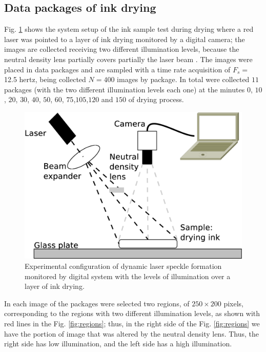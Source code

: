 \documentclass[review]{elsarticle}
\begin{document}
\subsection{Data packages of ink drying}
\label{sec:descriptionink}
Fig. \ref{fig:system} shows the system setup of the ink sample test during drying where
a red laser was pointed to a layer of ink drying monitored by a digital camera;
the images are collected receiving two different illumination levels, 
because the neutral density lens partially covers partially the laser beam \cite{REIS2016}.
The images were placed in data packages and
are sampled with a time rate acquisition of $F_s=$ 12.5 hertz, being 
collected $N=400$ images by package. In total were collected $11$ packages 
(with the two different illumination levels each one) at the minutes 
$0$, $10$, $20$, $30$, $40$, $50$, $60$, $75$,$105$,$120$ and $150$ of drying process. 
\begin{figure}[ht!]
\centering
\includegraphics[width=0.65\columnwidth]{system.eps}
\caption{Experimental configuration of dynamic laser speckle formation monitored by digital system with the levels of illumination over a layer of ink drying.}
\label{fig:system}
\end{figure}
In each image of the packages were selected two regions, of $250\times200$ pixels, 
corresponding to the regions with two different illumination levels, 
as shown with red lines in the Fig. \ref{fig:regions}; thus, 
in the right side of the Fig. \ref{fig:regions}  we have the
portion of image that was altered by the neutral density lens.
Thus, the right side has low illumination, and
the left side has a high illumination.
\end{document}

